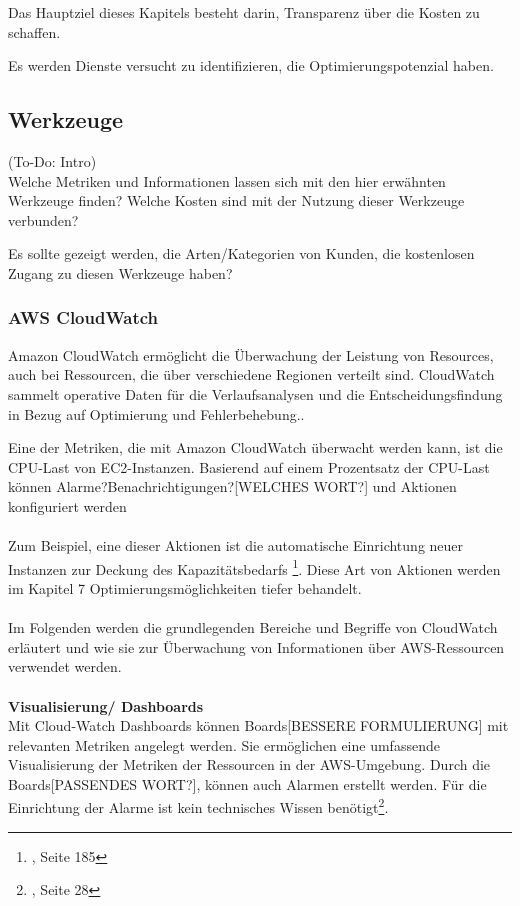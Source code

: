 Das Hauptziel dieses Kapitels besteht darin, Transparenz über die Kosten zu schaffen.

Es werden Dienste versucht zu identifizieren, die Optimierungspotenzial haben. 
\\
\subsection{Werkzeuge}
(To-Do: Intro)\\

Welche Metriken und Informationen lassen sich mit den hier erwähnten Werkzeuge finden?
Welche Kosten sind mit der Nutzung dieser Werkzeuge verbunden?


Es sollte gezeigt werden, die Arten/Kategorien von Kunden, die kostenlosen Zugang zu diesen Werkzeuge haben?


\subsubsection{AWS CloudWatch}

Amazon CloudWatch ermöglicht die Überwachung der Leistung von Resources, auch bei Ressourcen, die über verschiedene Regionen verteilt sind. 
CloudWatch sammelt operative Daten für die Verlaufsanalysen und die Entscheidungsfindung in Bezug auf Optimierung und Fehlerbehebung..

Eine der Metriken, die mit Amazon CloudWatch überwacht werden kann, ist die CPU-Last von EC2-Instanzen. 
Basierend auf einem Prozentsatz der CPU-Last können Alarme?Benachrichtigungen?[WELCHES WORT?] und Aktionen konfiguriert werden
\\\\
Zum Beispiel, eine dieser Aktionen ist die automatische Einrichtung neuer Instanzen zur Deckung des Kapazitätsbedarfs
\footnote{\cite{AWS1}, Seite 185}. 
Diese Art von Aktionen werden im Kapitel 7 Optimierungsmöglichkeiten tiefer behandelt.
\\\\
Im Folgenden werden die grundlegenden Bereiche und Begriffe von CloudWatch erläutert und wie sie zur Überwachung von Informationen über AWS-Ressourcen verwendet werden.
\\\\
\textbf{Visualisierung/ Dashboards}\\
Mit Cloud-Watch Dashboards können Boards[BESSERE FORMULIERUNG] mit relevanten Metriken angelegt werden. Sie ermöglichen eine umfassende Visualisierung der Metriken der Ressourcen in der AWS-Umgebung. Durch die Boards[PASSENDES WORT?], können auch Alarmen erstellt werden. Für die Einrichtung der Alarme ist kein technisches Wissen benötigt\footnote{\cite{AMZ14}, Seite 28}.

